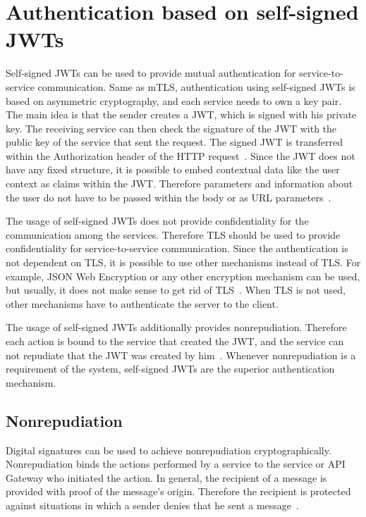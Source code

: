 \section{Authentication based on self-signed JWTs}
Self-signed JWTs can be used to provide mutual authentication for service-to-service communication.
Same as mTLS, authentication using self-signed JWTs is based on asymmetric cryptography, and each service needs to own a key pair.
The main idea is that the sender creates a JWT, which is signed with his private key.
The receiving service can then check the signature of the JWT with the public key of the service that sent the request.
The signed JWT is transferred within the Authorization header of the HTTP request~\cite{dias2020microservices}.
Since the JWT does not have any fixed structure, it is possible to embed contextual data like the user context as claims within the JWT.
Therefore parameters and information about the user do not have to be passed within the body or as URL parameters~\cite{dias2020microservices}.


The usage of self-signed JWTs does not provide confidentiality for the communication among the services.
Therefore TLS should be used to provide confidentiality for service-to-service communication.
Since the authentication is not dependent on TLS, it is possible to use other mechanisms instead of TLS.
For example, JSON Web Encryption or any other encryption mechanism can be used, but usually, it does not make sense to get rid of TLS~\cite{dias2020microservices}.
When TLS is not used, other mechanisms have to authenticate the server to the client.

The usage of self-signed JWTs additionally provides nonrepudiation.
Therefore each action is bound to the service that created the JWT, and the service can not repudiate that the JWT was created by him~\cite{dias2020microservices}.
Whenever nonrepudiation is a requirement of the system, self-signed JWTs are the superior authentication mechanism.

\subsection{Nonrepudiation}
Digital signatures can be used to achieve nonrepudiation cryptographically.
Nonrepudiation binds the actions performed by a service to the service or API Gateway who initiated the action.
In general, the recipient of a message is provided with proof of the message's origin.
Therefore the recipient is protected against situations in which a sender denies that he sent a message~\cite{wu20131200}.

